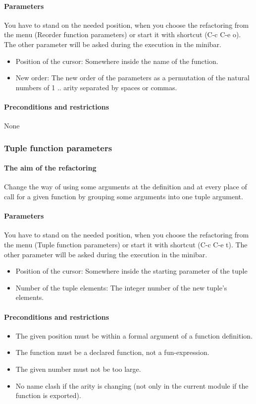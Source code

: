 \documentclass[12pt]{article}
\begin{document}
\paragraph{Parameters}
You have to stand on the needed position, when you choose the refactoring from the menu (Reorder function parameters) 
or start it with shortcut (C-c C-e o).
The other parameter will be asked during the execution in the minibar.
\begin{itemize}
	\item Position of the cursor: Somewhere inside the name of the function.
	\item New order: The new order of the parameters as a permutation of the natural numbers of 1 .. arity separated by spaces or commas.
\end{itemize}
\paragraph{Preconditions and restrictions} None

\subsubsection{Tuple function parameters}
\paragraph{The aim of the refactoring}
Change the way of using some arguments at  the definition and at 
every place of call  for a given function by grouping some arguments into one tuple argument.
\paragraph{Parameters}
You have to stand on the needed position, when you choose the refactoring from the menu (Tuple function parameters) 
or start it with shortcut (C-c C-e t).
The other parameter will be asked during the execution in the minibar.
\begin{itemize}
	\item Position of the cursor: Somewhere inside the starting parameter of the tuple
	\item Number of the tuple elements: The integer number of the new tuple's elements.
\end{itemize}
\paragraph{Preconditions and restrictions}
\begin{itemize}
	\item The given position must be within a formal argument of a function definition.
	\item The function must be a declared function, not a fun-expression.
	\item The given number must not be too large.
	\item No name clash if the arity is changing (not only in the current module if the function is exported).

\end{itemize}
\end{document}
